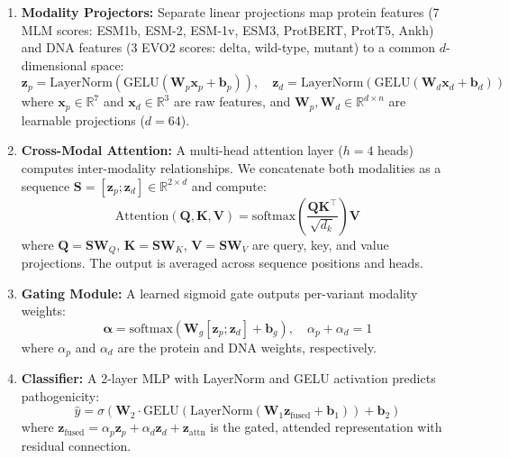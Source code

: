 \documentclass[9pt]{article}
\begin{document}
\begin{enumerate}
    \item \textbf{Modality Projectors:} Separate linear projections map protein features (7 MLM scores: ESM1b, ESM-2, ESM-1v, ESM3, ProtBERT, ProtT5, Ankh) and DNA features (3 EVO2 scores: delta, wild-type, mutant) to a common $d$-dimensional space:
    \begin{equation}
        \mathbf{z}_p = \text{LayerNorm}(\text{GELU}(\mathbf{W}_p \mathbf{x}_p + \mathbf{b}_p)), \quad \mathbf{z}_d = \text{LayerNorm}(\text{GELU}(\mathbf{W}_d \mathbf{x}_d + \mathbf{b}_d))
        \label{eq:project}
    \end{equation}
    where $\mathbf{x}_p \in \mathbb{R}^{7}$ and $\mathbf{x}_d \in \mathbb{R}^{3}$ are raw features, and $\mathbf{W}_p, \mathbf{W}_d \in \mathbb{R}^{d \times n}$ are learnable projections ($d=64$).
    
    \item \textbf{Cross-Modal Attention:} A multi-head attention layer ($h=4$ heads) computes inter-modality relationships. We concatenate both modalities as a sequence $\mathbf{S} = [\mathbf{z}_p; \mathbf{z}_d] \in \mathbb{R}^{2 \times d}$ and compute:
    \begin{equation}
        \text{Attention}(\mathbf{Q}, \mathbf{K}, \mathbf{V}) = \text{softmax}\left(\frac{\mathbf{Q}\mathbf{K}^\top}{\sqrt{d_k}}\right)\mathbf{V}
        \label{eq:attention}
    \end{equation}
    where $\mathbf{Q} = \mathbf{S}\mathbf{W}_Q$, $\mathbf{K} = \mathbf{S}\mathbf{W}_K$, $\mathbf{V} = \mathbf{S}\mathbf{W}_V$ are query, key, and value projections. The output is averaged across sequence positions and heads.
    
    \item \textbf{Gating Module:} A learned sigmoid gate outputs per-variant modality weights:
    \begin{equation}
        \boldsymbol{\alpha} = \text{softmax}(\mathbf{W}_g [\mathbf{z}_p; \mathbf{z}_d] + \mathbf{b}_g), \quad \alpha_p + \alpha_d = 1
        \label{eq:gate}
    \end{equation}
    where $\alpha_p$ and $\alpha_d$ are the protein and DNA weights, respectively.
    
    \item \textbf{Classifier:} A 2-layer MLP with LayerNorm and GELU activation predicts pathogenicity:
    \begin{equation}
        \hat{y} = \sigma(\mathbf{W}_2 \cdot \text{GELU}(\text{LayerNorm}(\mathbf{W}_1 \mathbf{z}_{\text{fused}} + \mathbf{b}_1)) + \mathbf{b}_2)
        \label{eq:classifier}
    \end{equation}
    where $\mathbf{z}_{\text{fused}} = \alpha_p \mathbf{z}_p + \alpha_d \mathbf{z}_d + \mathbf{z}_{\text{attn}}$ is the gated, attended representation with residual connection.
\end{enumerate}
\end{document}
